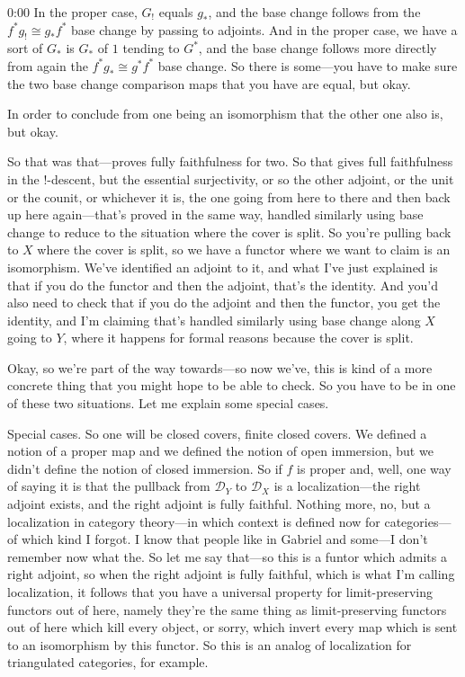 \begin{unfinished}{0:00}
In the proper case, $G_!$ equals $g_*$, and the base change follows from the $f^* g_! \cong g_* f^*$ base change by passing to adjoints. And in the proper case, we have a sort of $G_*$ is $G_*$ of $1$ tending to $G^*$, and the base change follows more directly from again the $f^* g_* \cong g^* f^*$ base change. So there is some---you have to make sure the two base change comparison maps that you have are equal, but okay.

In order to conclude from one being an isomorphism that the other one also is, but okay. 

So that was that---proves fully faithfulness for two. So that gives full faithfulness in the $!$-descent, but the essential surjectivity, or so the other adjoint, or the unit or the counit, or whichever it is, the one going from here to there and then back up here again---that's proved in the same way, handled similarly using base change to reduce to the situation where the cover is split. So you're pulling back to $X$ where the cover is split, so we have a functor where we want to claim is an isomorphism. We've identified an adjoint to it, and what I've just explained is that if you do the functor and then the adjoint, that's the identity. And you'd also need to check that if you do the adjoint and then the functor, you get the identity, and I'm claiming that's handled similarly using base change along $X$ going to $Y$, where it happens for formal reasons because the cover is split.

Okay, so we're part of the way towards---so now we've, this is kind of a more concrete thing that you might hope to be able to check. So you have to be in one of these two situations. Let me explain some special cases.

Special cases. So one will be closed covers, finite closed covers. We defined a notion of a proper map and we defined the notion of open immersion, but we didn't define the notion of closed immersion. So if $f$ is proper and, well, one way of saying it is that the pullback from $\mathcal{D}_Y$ to $\mathcal{D}_X$ is a localization---the right adjoint exists, and the right adjoint is fully faithful. Nothing more, no, but a localization in category theory---in which context is defined now for categories---of which kind I forgot. I know that people like in Gabriel and some---I don't remember now what the. So let me say that---so this is a funtor which admits a right adjoint, so when the right adjoint is fully faithful, which is what I'm calling localization, it follows that you have a universal property for limit-preserving functors out of here, namely they're the same thing as limit-preserving functors out of here which kill every object, or sorry, which invert every map which is sent to an isomorphism by this functor. So this is an analog of localization for triangulated categories, for example.


\end{unfinished}
